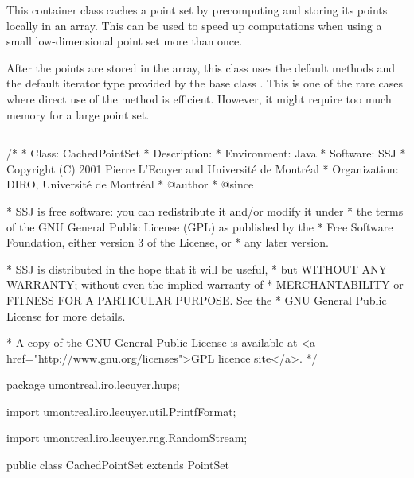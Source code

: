 
This container class caches a point set by precomputing
and storing its points locally in an array.
This can be used to speed up computations when using
a small low-dimensional point set more than once.

\begin{detailed} %
After the points are stored in the array, this class uses
the default methods and the default iterator type provided by
the base class .
This is one of the rare cases where direct use of the
 method is efficient.
 However, it might require too much memory for a large point set.
\end{detailed} %


\bigskip\hrule\bigskip

\begin{code}
\begin{hide}
/*
 * Class:        CachedPointSet
 * Description:  
 * Environment:  Java
 * Software:     SSJ 
 * Copyright (C) 2001  Pierre L'Ecuyer and Université de Montréal
 * Organization: DIRO, Université de Montréal
 * @author       
 * @since

 * SSJ is free software: you can redistribute it and/or modify it under
 * the terms of the GNU General Public License (GPL) as published by the
 * Free Software Foundation, either version 3 of the License, or
 * any later version.

 * SSJ is distributed in the hope that it will be useful,
 * but WITHOUT ANY WARRANTY; without even the implied warranty of
 * MERCHANTABILITY or FITNESS FOR A PARTICULAR PURPOSE.  See the
 * GNU General Public License for more details.

 * A copy of the GNU General Public License is available at
   <a href="http://www.gnu.org/licenses">GPL licence site</a>.
 */
\end{hide}
package umontreal.iro.lecuyer.hups;\begin{hide}

import umontreal.iro.lecuyer.util.PrintfFormat;
\end{hide}
    import umontreal.iro.lecuyer.rng.RandomStream;


public class CachedPointSet extends PointSet \begin{hide} {
   protected PointSet P;        // Original PointSet which is cached here.
   protected double x[][];      // Cached points.
   protected CachedPointSet() {}
\end{hide}
\end{code}

